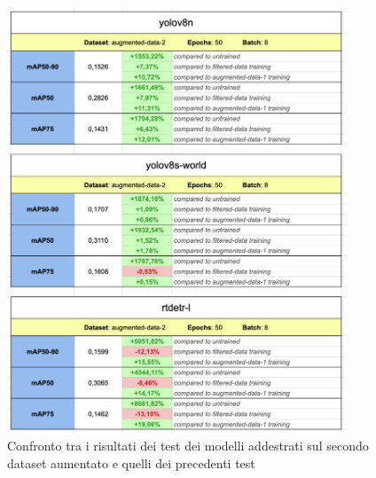 \begin{figure}[ht]
    \centering
    \includegraphics[width=0.9\textwidth]{files/capitoli/4-sperimentazione-risultati/assets/augmented-data-2-compare.png}
    \caption{\label{fig:augmented-data-2-compare}Confronto tra i risultati dei test dei modelli addestrati sul secondo dataset aumentato e quelli dei precedenti test}
\end{figure}

\clearpage

